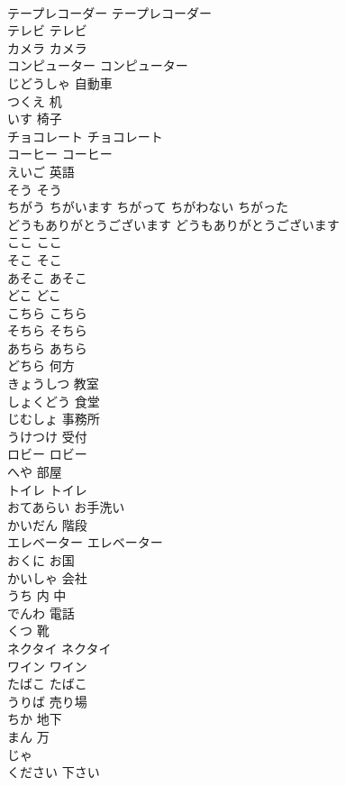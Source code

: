 \documentclass[8pt]{extreport}
\begin{document}
\begin{CJK}{UTF8}{min}
\\	テープレコーダー	テープレコーダー
\\	テレビ	テレビ
\\	カメラ	カメラ
\\	コンピューター	コンピューター
\\	じどうしゃ	自動車
\\	つくえ	机
\\	いす	椅子
\\	チョコレート	チョコレート
\\	コーヒー	コーヒー
\\	えいご	英語
\\	そう	そう
\\	ちがう	ちがいます	ちがって	ちがわない	ちがった	
\\	どうもありがとうございます	どうもありがとうございます
\\	ここ	ここ
\\	そこ	そこ
\\	あそこ	あそこ
\\	どこ	どこ
\\	こちら	こちら
\\	そちら	そちら
\\	あちら	あちら
\\	どちら	何方
\\	きょうしつ	教室
\\	しょくどう	食堂
\\	じむしょ	事務所
\\	うけつけ	受付
\\	ロビー	ロビー
\\	へや	部屋
\\	トイレ	トイレ
\\	おてあらい	お手洗い
\\	かいだん	階段
\\	エレベーター	エレベーター
\\	おくに	お国
\\	かいしゃ	会社
\\	うち	内 中
\\	でんわ	電話
\\	くつ	靴
\\	ネクタイ	ネクタイ
\\	ワイン	ワイン
\\	たばこ	たばこ
\\	うりば	売り場
\\	ちか	地下
\\	まん	万
\\	じゃ	
\\	ください	下さい

\end{CJK}
\end{document}
